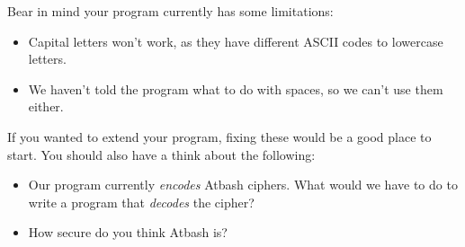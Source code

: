 		Bear in mind your program currently has some limitations:
		\begin{itemize}[nosep]
			\item Capital letters won't work, as they have different ASCII codes to lowercase letters.
			\item We haven't told the program what to do with spaces, so we can't use them either.
		\end{itemize}
	
		If you wanted to extend your program, fixing these would be a good place to start. You should also have a think about the following:
		
		\begin{itemize}[nosep]
			\item Our program currently \textit{encodes} Atbash ciphers. What would we have to do to write a program that \textit{decodes} the cipher?
			\item How secure do you think Atbash is?
		\end{itemize}